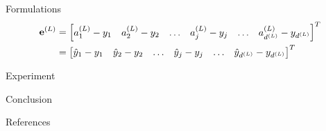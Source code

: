 \documentclass[10pt]{beamer}
\theoremstyle{remark}
\theoremstyle{definition}
\begin{document}
\begin{frame}[allowframebreaks]{Formulations}
	\begin{equation}
		\begin{aligned}
			\bold{e}^{(L)}&=\begin{bmatrix} a_1^{(L)} - y_1 & a_2^{(L)} - y_2 & \dots & a_j^{(L)} - y_j & \dots & a_{d^{(L)}}^{(L)} - y_{d^{(L)}} \end{bmatrix}^T\\&=\begin{bmatrix} \hat{y}_1 - y_1 & \hat{y}_2 - y_2 & \dots & \hat{y}_j - y_j & \dots & \hat{y}_{d^{(L)}} - y_{d^{(L)}} \end{bmatrix}^T
		\end{aligned}
	\end{equation}

\end{frame}

\begin{frame}[allowframebreaks]{Experiment}
\end{frame}

\begin{frame}[allowframebreaks]{Conclusion}
\end{frame}

\begin{frame}[allowframebreaks]{References}
\printbibliography
\end{frame}
\end{document}
